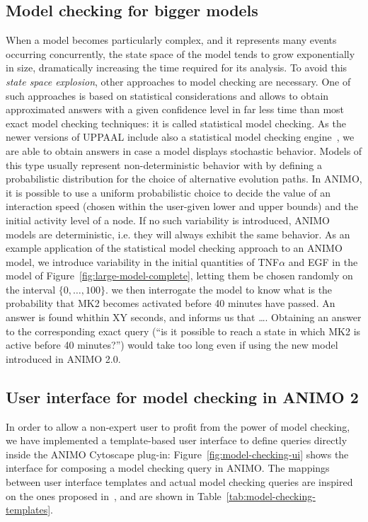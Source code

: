 \documentclass{bmcart}
\begin{document}
\subsection*{Model checking for bigger models}
When a model becomes particularly complex, and it represents many events occurring concurrently,
the state space of the model tends to grow exponentially in size, dramatically
increasing the time required for its analysis. To avoid this \emph{state space explosion},
other approaches to model checking are necessary. One of such approaches is based on statistical
considerations and allows to obtain approximated answers with a given confidence level in far less time
than most exact model checking techniques: it is called statistical model checking. As the newer
versions of UPPAAL include also a statistical model checking engine~\cite{uppaal-smc}, we are
able to obtain answers in case a model displays stochastic behavior. Models of this type 
usually represent non-deterministic behavior with by defining a probabilistic distribution for the
choice of alternative evolution paths. In ANIMO, it is possible to use a uniform probabilistic choice
to decide the value of an interaction speed (chosen within the user-given lower and upper bounds)
and the initial activity level of a node. If no such variability is introduced, ANIMO models are deterministic,
i.e. they will always exhibit the same behavior. As an example application of the statistical model checking
approach to an ANIMO model, we introduce variability in the initial quantities of TNF$\alpha$ and EGF
in the model of Figure~\ref{fig:large-model-complete}, letting them be chosen randomly on the interval $\{0, \dots, 100\}$.
we then interrogate the model to know what is the probability that MK2 becomes activated before 40 minutes
have passed. An answer is found whithin XY seconds, and informs us that \dots.
Obtaining an answer to the corresponding exact query (``is it possible to reach a state in which MK2 is active
before 40 minutes?'') would take too long even if using the new model introduced in ANIMO 2.0.



\subsection*{User interface for model checking in ANIMO 2}\label{sec:animo-model-checking-ui}
In order to allow a non-expert user to profit from the power of model checking, we have implemented
a template-based user interface to define queries directly inside the ANIMO Cytoscape plug-in:
Figure~\ref{fig:model-checking-ui} shows the interface for composing a model checking query in ANIMO.
The mappings between user interface templates and actual model checking queries are inspired
on the ones proposed in~\cite{hidde-templates}, and are shown in Table~\ref{tab:model-checking-templates}.
\end{document}
